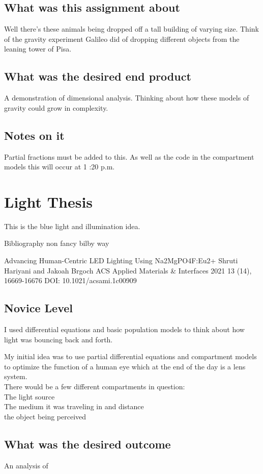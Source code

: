 \subsection{What was this assignment about}
Well there's these animals being dropped off a tall building of varying size. Think of the gravity experiment Galileo did of dropping different objects from the leaning tower of Pisa. \\ 

\subsection{What was the desired end product}
A demonstration of dimensional analysis. Thinking about how these models of gravity could grow in complexity. 

\subsection{Notes on it}

Partial fractions must be added to this. As well as the code in the compartment models this will occur at 1 :20 p.m. 


\section{Light Thesis}

This is the blue light and illumination idea. 


Bibliography non fancy bilby way

Advancing Human-Centric LED Lighting Using Na2MgPO4F:Eu2+
Shruti Hariyani and Jakoah Brgoch
ACS Applied Materials & Interfaces 2021 13 (14), 16669-16676
DOI: 10.1021/acsami.1c00909

\subsection{Novice Level}
I used differential equations and basic population models to think about how light was bouncing back and forth. 

My initial idea was to use partial differential equations and compartment models to optimize the function of a human eye which at the end of the day is a lens system. \\ 

There would be a few different compartments in question: \\ 
The light source \\

The medium it was traveling in and distance \\ 

the object being perceived \\ 





\subsection{What was the desired outcome}
An analysis of 

